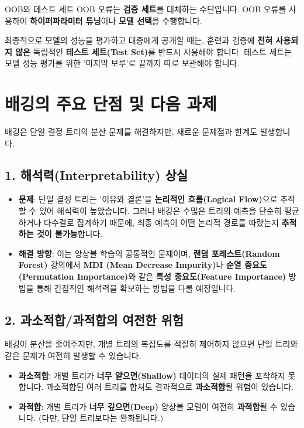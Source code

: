 \documentclass[11pt,a4paper]{book}
\theoremstyle{definition}
\begin{document}
\begin{cautionbox}{OOB와 테스트 세트}
OOB 오류는 \textbf{검증 세트}를 대체하는 수단입니다. OOB 오류를 사용하여 \textbf{하이퍼파라미터 튜닝}이나 \textbf{모델 선택}을 수행합니다.

최종적으로 모델의 성능을 평가하고 대중에게 공개할 때는, 훈련과 검증에 \textbf{전혀 사용되지 않은} 독립적인 \textbf{테스트 세트(Test Set)}를 반드시 사용해야 합니다. 테스트 세트는 모델 성능 평가를 위한 '마지막 보루'로 끝까지 따로 보관해야 합니다.
\end{cautionbox}


\section{배깅의 주요 단점 및 다음 과제}
\label{sec:drawbacks}

배깅은 단일 결정 트리의 분산 문제를 해결하지만, 새로운 문제점과 한계도 발생합니다.

\subsection{1. 해석력(Interpretability) 상실}

\begin{itemize}
    \item \textbf{문제}: 단일 결정 트리는 '이유와 결론'을 \textbf{논리적인 흐름(Logical Flow)}으로 추적할 수 있어 해석력이 높았습니다. 그러나 배깅은 수많은 트리의 예측을 단순히 평균하거나 다수결로 집계하기 때문에, 최종 예측이 어떤 논리적 경로를 따랐는지 \textbf{추적하는 것이 불가능}합니다.
    \item \textbf{해결 방향}: 이는 앙상블 학습의 공통적인 문제이며, \textbf{랜덤 포레스트(Random Forest)} 강의에서 \textbf{MDI (Mean Decrease Impurity)}나 \textbf{순열 중요도(Permutation Importance)}와 같은 \textbf{특성 중요도(Feature Importance)} 방법을 통해 간접적인 해석력을 확보하는 방법을 다룰 예정입니다.
\end{itemize}

\subsection{2. 과소적합/과적합의 여전한 위험}

배깅이 분산을 줄여주지만, 개별 트리의 복잡도를 적절히 제어하지 않으면 단일 트리와 같은 문제가 여전히 발생할 수 있습니다.

\begin{itemize}
    \item \textbf{과소적합}: 개별 트리가 \textbf{너무 얕으면(Shallow)} 데이터의 실제 패턴을 포착하지 못합니다. 과소적합된 여러 트리를 합쳐도 결과적으로 \textbf{과소적합}될 위험이 있습니다.
    \item \textbf{과적합}: 개별 트리가 \textbf{너무 깊으면(Deep)} 앙상블 모델이 여전히 \textbf{과적합}될 수 있습니다. (다만, 단일 트리보다는 완화됩니다.)
\end{itemize}
\end{document}
